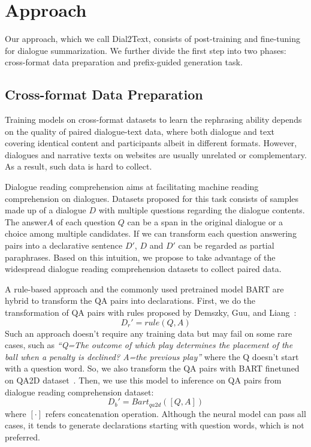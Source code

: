 \section{Approach}
\label{sec:approach}

Our approach, which we call Dial2Text, consists of post-training 
and fine-tuning for dialogue summarization. We further divide the first step into 
two phases: cross-format data preparation and prefix-guided generation task. 

\subsection{Cross-format Data Preparation}\label{sec:dcd}

Training models on cross-format datasets to learn the rephrasing ability 
depends on the quality of paired dialogue-text data, where both dialogue and text 
covering identical content and participants albeit in different formats. However, dialogues and narrative texts on websites are usually
unrelated or complementary.
As a result, such data is hard to collect.

Dialogue reading comprehension aims at facilitating machine reading comprehension on dialogues. Datasets proposed for this task consists of samples made up of a dialogue 
$D$ with multiple questions regarding the dialogue contents. 
The answer$A$ of each question $Q$ can be a span in the original dialogue or 
a choice among multiple candidates.
If we can transform each question answering pairs into a declarative sentence $D'$, 
$D$ and $D'$ can be regarded as partial paraphrases. 
Based on this intuition, we propose to take advantage of the widespread
dialogue reading comprehension datasets to collect paired data.

A rule-based approach and the commonly used pretrained model BART are hybrid to transform the QA pairs into declarations. 
First, we do the transformation of QA pairs with rules proposed by 
Demszky, Guu, and Liang~:
\begin{equation}
D_r'=rule(Q, A)
\end{equation}
Such an approach doesn't require any training data but may fail on some rare cases, such as \textit{``Q=The outcome of which play determines the placement of the ball when a penalty is declined? A=the previous play''} where the Q doesn't start with a question word. 
So, we also transform the QA pairs with BART finetuned on QA2D dataset~\cite{demszky2018transforming}. Then, we use this model to inference on QA pairs from dialogue reading comprehension dataset:
\begin{equation}
	D_b'=Bart_{qa2d}([Q, A])
\end{equation}
where $[\cdot]$ refers concatenation operation. Although the neural model can pass all cases, it tends to generate declarations starting with question words, which is not preferred.



